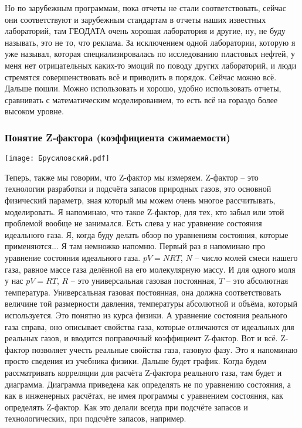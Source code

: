 \documentclass[main.tex]{subfiles}
\begin{document}
Но по зарубежным программам, пока отчеты не стали соответствовать, сейчас они соответствуют и зарубежным стандартам в отчеты наших известных лабораторий, там ГЕОДАТА очень хорошая лаборатория и другие, ну, не буду называть, это не то, что реклама.
За исключением одной лаборатории, которую я уже называл, которая специализировалась по исследованию пластовых нефтей, у меня нет отрицательных каких-то эмоций по поводу других лабораторий, и люди стремятся совершенствовать всё и приводить в порядок.
Сейчас можно всё.
Дальше пошли.
Можно использовать и хорошо, удобно использовать отчеты, сравнивать с математическим моделированием, то есть всё на гораздо более высоком уровне.

\subsubsection{Понятие Z-фактора (коэффициента сжимаемости)}

\begin{center}
\texttt{[image: Брусиловский.pdf]}
\end{center}

Теперь, также мы говорим, что Z-фактор мы измеряем.
Z-фактор -- это технологии разработки и подсчёта запасов природных газов, это основной физический параметр, зная который мы можем очень многое рассчитывать, моделировать.
Я напоминаю, что такое Z-фактор, для тех, кто забыл или этой проблемой вообще не занимался.
Есть слева у нас уравнение состояния идеального газа.
Я, когда буду делать обзор по уравнениям состояния, которые применяются...
Я там немножко напомню.
Первый раз я напоминаю про уравнение состояния идеального газа.
$pV=NRT$, $N$ -- число молей смеси нашего газа, равное массе газа делённой на его молекулярную массу.
И для одного моля у нас $pV=RT$, $R$ -- это универсальная газовая постоянная, $T$ -- это абсолютная температура.
Универсальная газовая постоянная, она должна соответствовать величине той размерности давления, температуры абсолютной и объёма, который используется.
Это понятно из курса физики.
А уравнение состояния реального газа справа, оно описывает свойства газа, которые отличаются от идеальных для реальных газов, и вводится поправочный коэффициент Z-фактор.
Вот и всё.
Z-фактор позволяет учесть реальные свойства газа, газовую фазу.
Это я напоминаю просто сведения из учебника физики.
Дальше будет график.
Когда будем рассматривать корреляции для расчёта Z-фактора реального газа, там будет и диаграмма.
Диаграмма приведена как определять не по уравнению состояния, а как в инженерных расчётах, не имея программы с уравнением состояния, как определять Z-фактор.
Как это делали всегда при подсчёте запасов и технологических, при подсчёте запасов, например.
\end{document}
